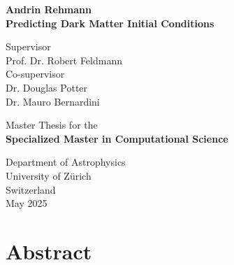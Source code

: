 \documentclass{article}
\begin{document}
\begin{titlepage}
   \begin{center}
      \large
       \textbf{Andrin Rehmann}\\
       \vspace*{0.5cm}
        \Huge
       \textbf{Predicting Dark Matter Initial Conditions}\\
       \large
     \vspace*{0.5cm}
       
        \large
       \vspace{1.5cm}

        Supervisor \\
        Prof. Dr. Robert Feldmann \\

        \vspace{0.5cm}
        Co-supervisor \\
        Dr. Douglas Potter \\
        Dr. Mauro Bernardini 
        
 
       \vfill
            
       Master Thesis for the\\
       \textbf{Specialized Master in Computational Science}
            
       \vspace{0.8cm}
     
            
       Department of Astrophysics\\
       University of Zürich\\
       Switzerland\\
       May 2025
            
   \end{center}
\end{titlepage}

\newpage

\section*{Abstract}
\end{document}
